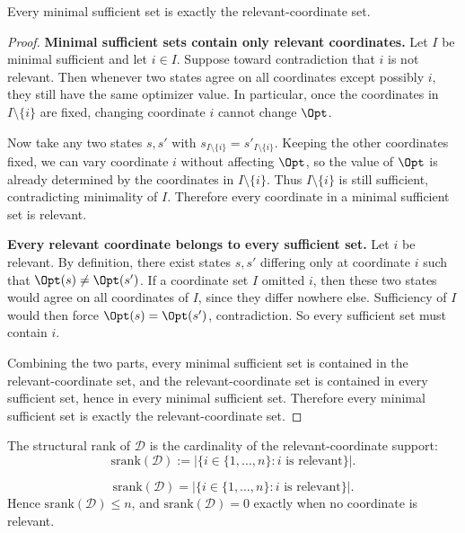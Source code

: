 \begin{proposition}\label{prop:minimal-relevant-equiv}
Every minimal sufficient set is exactly the relevant-coordinate set.
\end{proposition}

\begin{proof}
\textbf{Minimal sufficient sets contain only relevant coordinates.}
Let $I$ be minimal sufficient and let $i\in I$. Suppose toward contradiction that $i$ is not relevant. Then whenever two states agree on all coordinates except possibly $i$, they still have the same optimizer value. In particular, once the coordinates in $I\setminus\{i\}$ are fixed, changing coordinate $i$ cannot change $\Opt$.

Now take any two states $s,s'$ with $s_{I\setminus\{i\}}=s'_{I\setminus\{i\}}$. Keeping the other coordinates fixed, we can vary coordinate $i$ without affecting $\Opt$, so the value of $\Opt$ is already determined by the coordinates in $I\setminus\{i\}$. Thus $I\setminus\{i\}$ is still sufficient, contradicting minimality of $I$. Therefore every coordinate in a minimal sufficient set is relevant.

\textbf{Every relevant coordinate belongs to every sufficient set.}
Let $i$ be relevant. By definition, there exist states $s,s'$ differing only at coordinate $i$ such that $\Opt(s)\neq\Opt(s')$. If a coordinate set $I$ omitted $i$, then these two states would agree on all coordinates of $I$, since they differ nowhere else. Sufficiency of $I$ would then force $\Opt(s)=\Opt(s')$, contradiction. So every sufficient set must contain $i$.

Combining the two parts, every minimal sufficient set is contained in the relevant-coordinate set, and the relevant-coordinate set is contained in every sufficient set, hence in every minimal sufficient set. Therefore every minimal sufficient set is exactly the relevant-coordinate set.
\end{proof}

\begin{definition}\label{def:srank}
The structural rank of $\mathcal{D}$ is the cardinality of the relevant-coordinate support:
\[
\mathrm{srank}(\mathcal{D}) :=
\left|\{i \in \{1,\ldots,n\} : i \text{ is relevant}\}\right|.
\]
\end{definition}

\begin{proposition}\label{prop:srank-support}
\[
\mathrm{srank}(\mathcal{D})
=
\left|\{i \in \{1,\ldots,n\} : i \text{ is relevant}\}\right|.
\]
Hence $\mathrm{srank}(\mathcal{D}) \le n$, and $\mathrm{srank}(\mathcal{D})=0$ exactly when no coordinate is relevant.
\end{proposition}

